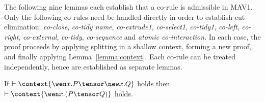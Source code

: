 \documentclass[UKenglish,acmsmall,authorversion]{acmart}
\theoremstyle{plain}
\begin{document}

The following nine lemmas each establish that a co-rule is admissible in \textsf{MAV1}.
Only the following co-rules need be handled directly in order to establish cut elimination:
\textit{co-close}, \textit{co-tidy name}, \textit{co-extrude1}, \textit{co-select1}, \textit{co-tidy1}, \textit{co-left}, \textit{co-right}, \textit{co-external}, \textit{co-tidy}, \textit{co-sequence} and \textit{atomic co-interaction}.
In each case, the proof proceeds by applying splitting in a shallow context, forming a new proof, and finally applying Lemma~\ref{lemma:context}. 
Each co-rule can be treated independently, hence are established as separate lemmas.
%
\begin{lemma}[co-close]
\label{lemma:co-close}
If $\vdash \context{ \wen x. P \tensor \new x. Q }$ holds
then $\vdash \context{ \mathopen{\wen x.} \left( P \tensor Q \right) }$ holds.
\end{lemma}
\end{document}
